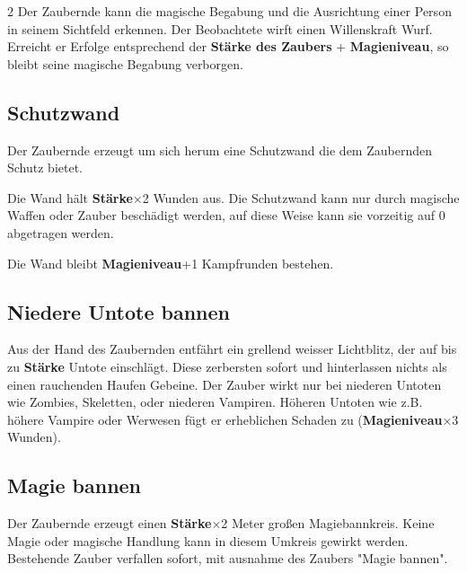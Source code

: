 \begin{multicols*}{2}
Der Zaubernde kann die magische Begabung und die Ausrichtung einer Person in seinem Sichtfeld erkennen. Der Beobachtete wirft einen Willenskraft Wurf. Erreicht er Erfolge entsprechend der \textbf{Stärke des Zaubers} + \textbf{Magieniveau}, so bleibt seine magische Begabung verborgen.



\subsection{Schutzwand}

Der Zaubernde erzeugt um sich herum eine Schutzwand die dem Zaubernden Schutz bietet.

Die Wand hält \textbf{Stärke}×2 Wunden aus. Die Schutzwand kann nur durch magische Waffen oder Zauber beschädigt werden, auf diese Weise kann sie vorzeitig auf 0 abgetragen werden.

Die Wand bleibt \textbf{Magieniveau}+1 Kampfrunden bestehen.



\subsection{Niedere Untote bannen}

Aus der Hand des Zaubernden entfährt ein grellend weisser Lichtblitz, der auf bis zu \textbf{Stärke} Untote einschlägt. Diese zerbersten sofort und hinterlassen nichts als einen rauchenden Haufen Gebeine. Der Zauber wirkt nur bei niederen Untoten wie Zombies, Skeletten, oder niederen Vampiren. Höheren Untoten wie z.B. höhere Vampire oder Werwesen fügt er erheblichen Schaden zu (\textbf{Magieniveau}×3 Wunden).



\subsection{Magie bannen}

Der Zaubernde erzeugt einen \textbf{Stärke}×2 Meter großen Magiebannkreis. Keine Magie oder magische Handlung kann in diesem Umkreis gewirkt werden. Bestehende Zauber verfallen sofort, mit ausnahme des Zaubers "Magie bannen".


\end{multicols*}

